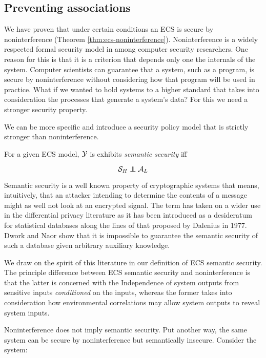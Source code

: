 \documentclass[../thesis.tex]{subfiles}
\begin{document}
\subsection{Preventing associations}
\label{sec:prevention}

We have proven that under certain conditions
an ECS is secure by noninterference
(Theorem \ref{thm:ecs-noninterference}).
Noninterference is a widely respected formal
security model in among computer security
researchers.
One reason for this is that it is a criterion
that depends only one the internals of the
system.
Computer scientists can guarantee that a system,
such as a program, is secure by noninterference
without considering how that program will be used
in practice.
What if we wanted to hold systems to a higher standard
that takes into consideration the processes that generate
a system's data?
For this we need a stronger security property.

We can be more specific and introduce a security policy model
that is strictly stronger than noninterference.

\begin{dfn} %
  For a given ECS model, $\mathcal{Y}$ is
  exhibits \emph{semantic security} iff

  $$ \mc{S}_H \independent \A_L $$
\end{dfn}

Semantic security is a well known property of
cryptographic systems that means, intuitively,
that an attacker intending to determine the
contents of a message might as well not look at
an encrypted signal.
The term has taken on a wider use in the differential
privacy literature as it has been introduced
as a desideratum for statistical
databases along the lines of that proposed
by Dalenius in 1977. \cite{dalenius77statistik, dwork06icalp}
Dwork and Naor \cite{dwork06icalp,dwork08jpc} show that it is impossible to
guarantee the semantic security of such a database
given arbitrary auxiliary knowledge.

We draw on the spirit of this literature in our
definition of ECS semantic security.
The principle difference between ECS semantic
security and noninterference is that the
latter is concerned with the Independence of
system outputs from sensitive inputs
\emph{conditioned} on the inputs,
whereas the former takes into consideration
how environmental correlations may allow
system outputs to reveal system inputs.

Noninterference does not imply semantic security.
Put another way, the same system can be secure by
noninterference but semantically insecure.
Consider the system:
\end{document}
